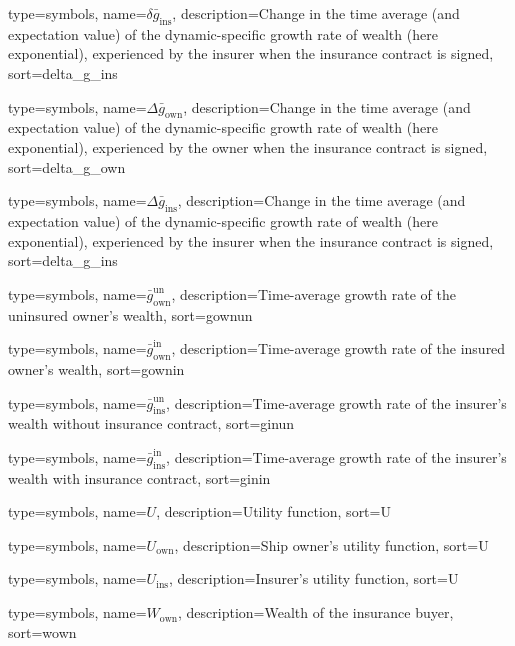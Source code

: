 {
 type={symbols}, 
 name={\ensuremath{\delta \bar{g}_{\text{ins}}}},
 description={Change in the time average (and expectation value) of the dynamic-specific growth rate of wealth (here exponential), experienced by the insurer when the insurance contract is signed},
 sort=delta_g_ins
}

{
 type={symbols}, 
 name={\ensuremath{\Delta \bar{g}_{\text{own}}}},
 description={Change in the time average (and expectation value) of the dynamic-specific growth rate of wealth (here exponential), experienced by the owner when the insurance contract is signed},
 sort=delta_g_own
}

{
 type={symbols}, 
 name={\ensuremath{\Delta \bar{g}_{\text{ins}}}},
 description={Change in the time average (and expectation value) of the dynamic-specific growth rate of wealth (here exponential), experienced by the insurer when the insurance contract is signed},
 sort=delta_g_ins
}

{
  type={symbols}, 
  name={\ensuremath{\bar{g}_{\text{own}}^{\text{un}}}},
  description={Time-average growth rate of the uninsured owner's wealth},
  sort=gownun
}

{
  type={symbols}, 
  name={\ensuremath{\bar{g}_{\text{own}}^{\text{in}}}},
  description={Time-average growth rate of the insured owner's wealth},
  sort=gownin
}


{
  type={symbols}, 
  name={\ensuremath{\bar{g}_{\text{ins}}^{\text{un}}}},
  description={Time-average growth rate of the insurer's wealth without insurance contract},
  sort=ginun
}

{
  type={symbols}, 
  name={\ensuremath{\bar{g}_{\text{ins}}^{\text{in}}}},
  description={Time-average growth rate of the insurer's wealth with insurance contract},
  sort=ginin
}

{
  type={symbols}, 
  name={\ensuremath{U}},
  description={Utility function},
  sort=U
}

{
  type={symbols}, 
  name={\ensuremath{U_{\text{own}}}},
  description={Ship owner's utility function},
  sort=U
}

{
  type={symbols}, 
  name={\ensuremath{U_{\text{ins}}}},
  description={Insurer's utility function},
  sort=U
}

{
  type={symbols}, 
  name={\ensuremath{W_{\text{own}}}},
  description={Wealth of the insurance buyer},
  sort=wown
}

